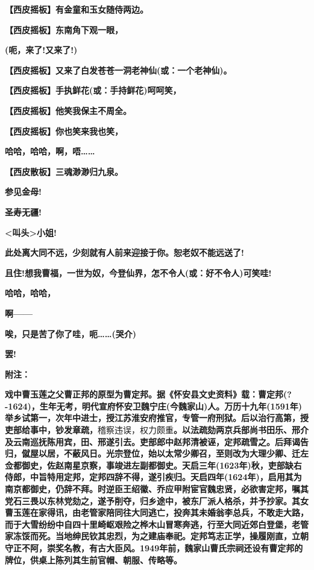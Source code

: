 \textbf{【西皮摇板】有金童和玉女随侍两边。}

\textbf{【西皮摇板】东南角下观一眼，}

\textbf{(呃，来了!又来了!)}

\textbf{【西皮摇板】又来了白发苍苍一洞老神仙(或：一个老神仙)。}

\textbf{【西皮摇板】手执鲜花(或：手持鲜花)呵呵笑，}

\textbf{【西皮摇板】他笑我保主不周全。}

\textbf{【西皮摇板】你也笑来我也笑，}

\textbf{哈哈，哈哈，啊，唔\ldots{}\ldots{}}

\textbf{【西皮散板】三魂渺渺归九泉。}

\textbf{参见金母!}

\textbf{圣寿无疆!}

\textbf{\textless{}叫头\textgreater{}小姐!}

\textbf{此处离大同不远，少刻就有人前来迎接于你。恕老奴不能远送了!}

\textbf{且住!想我曹福，一世为奴，今登仙界，怎不令人(或：好不令人)可笑哇!}

\textbf{哈哈，哈哈，}

\textbf{啊------}

\textbf{唉，只是苦了你了哇，呃\ldots{}\ldots{}(哭介)}

\textbf{罢!}

\textbf{附注：}

\textbf{戏中曹玉莲之父曹正邦的原型为曹定邦。据《怀安县文史资料》载：曹定邦(?-1624)，生年无考，明代宣府怀安卫魏宁庄(今魏家山)人。万历十九年(1591年)举乡试第一，次年中进士，授江苏淮安府推官，专管一府刑狱。后以治行高第，授吏部给事中，钞发章疏，}稽察违误，权力颇重\textbf{。以法疏劾两京兵部尚书田乐、邢介及云南巡抚陈用宾，田、邢遂引去。吏部郎中赵邦清被诬，定邦疏雪之。后拜谒告归，僦屋以居，不蔽风日。光宗登位，始以太常少卿召，至则改为大理少卿、迁左佥都御史，佐赵南星京察，事竣进左副都御史。天启三年(1623年)秋，吏部缺右侍郎，中旨特用定邦，定邦四辞不得，遂引疾归。天启四年(1624年)，启用其为南京都御史，仍辞不拜。时逆臣王绍徽、乔应甲附宦官魏忠贤，必欲害定邦，嘱其党石三畏以东林党劾之，遂予削夺，归乡途中，被东厂派人格杀，并予抄家。其女曹玉莲在家得讯，由老管家陪同往大同逃亡，投奔其未婚翁李总兵，不敢走大路，而于大雪纷纷中自四十里崎岖艰险之桦木山冒寒奔逃，行至大同近郊白登堡，老管家冻馁而死。当地绅民钦其忠烈，为之建庙奉祀。定邦笃志正学，操履刚直，立朝守正不阿，崇奖名教，有古大臣风。1949年前，魏家山曹氏宗祠还设有曹定邦的牌位，供桌上陈列其生前官帽、朝服、传略等。}

